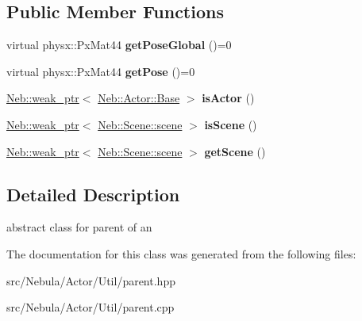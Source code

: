 \subsection*{\-Public \-Member \-Functions}
\begin{DoxyCompactItemize}
\item 
\hypertarget{classNeb_1_1Actor_1_1parent_a621c0e5130e97130b638f81a3fd92395}{virtual physx\-::\-Px\-Mat44 {\bfseries get\-Pose\-Global} ()=0}\label{classNeb_1_1Actor_1_1parent_a621c0e5130e97130b638f81a3fd92395}

\item 
\hypertarget{classNeb_1_1Actor_1_1parent_acaa19d6eee398a5394113f8c70b187a3}{virtual physx\-::\-Px\-Mat44 {\bfseries get\-Pose} ()=0}\label{classNeb_1_1Actor_1_1parent_acaa19d6eee398a5394113f8c70b187a3}

\item 
\hypertarget{classNeb_1_1Actor_1_1parent_a008be988dfa197a878a6622314f91a93}{\hyperlink{classNeb_1_1weak__ptr}{\-Neb\-::weak\-\_\-ptr}$<$ \hyperlink{classNeb_1_1Actor_1_1Base}{\-Neb\-::\-Actor\-::\-Base} $>$ {\bfseries is\-Actor} ()}\label{classNeb_1_1Actor_1_1parent_a008be988dfa197a878a6622314f91a93}

\item 
\hypertarget{classNeb_1_1Actor_1_1parent_a9c132ce167bbc2b99d1df0d8e1932918}{\hyperlink{classNeb_1_1weak__ptr}{\-Neb\-::weak\-\_\-ptr}$<$ \hyperlink{classNeb_1_1Scene_1_1scene}{\-Neb\-::\-Scene\-::scene} $>$ {\bfseries is\-Scene} ()}\label{classNeb_1_1Actor_1_1parent_a9c132ce167bbc2b99d1df0d8e1932918}

\item 
\hypertarget{classNeb_1_1Actor_1_1parent_a39169d56c3becf729bd970e2bdd63262}{\hyperlink{classNeb_1_1weak__ptr}{\-Neb\-::weak\-\_\-ptr}$<$ \hyperlink{classNeb_1_1Scene_1_1scene}{\-Neb\-::\-Scene\-::scene} $>$ {\bfseries get\-Scene} ()}\label{classNeb_1_1Actor_1_1parent_a39169d56c3becf729bd970e2bdd63262}

\end{DoxyCompactItemize}


\subsection{\-Detailed \-Description}
abstract class for parent of an  

\-The documentation for this class was generated from the following files\-:\begin{DoxyCompactItemize}
\item 
src/\-Nebula/\-Actor/\-Util/parent.\-hpp\item 
src/\-Nebula/\-Actor/\-Util/parent.\-cpp\end{DoxyCompactItemize}
